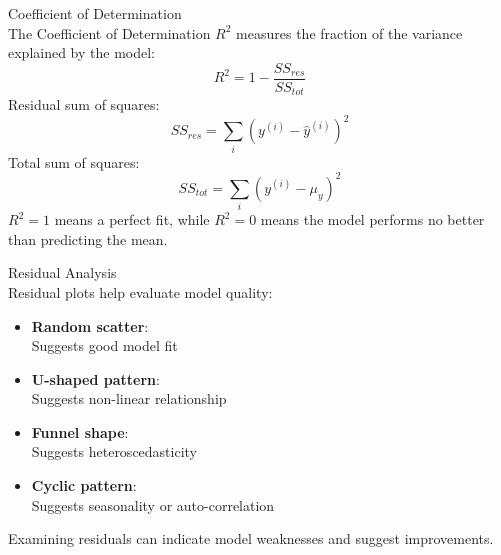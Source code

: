 \begin{theorem}{Coefficient of Determination}\\
The Coefficient of Determination $R^2$ measures the fraction of the variance explained by the model:
\[R^2 = 1 - \frac{SS_{res}}{SS_{tot}}\]
Residual sum of squares:
$$SS_{res} = \sum_i (y^{(i)} - \hat{y}^{(i)})^2$$
Total sum of squares:
$$SS_{tot} = \sum_i (y^{(i)} - \mu_y)^2$$
$R^2 = 1$ means a perfect fit, while $R^2 = 0$ means the model performs no better than predicting the mean.
\end{theorem}

\begin{corollary}{Residual Analysis}\\
Residual plots help evaluate model quality:
\begin{itemize}
    \item \textbf{Random scatter}: \\Suggests good model fit
    \item \textbf{U-shaped pattern}: \\ Suggests non-linear relationship
    \item \textbf{Funnel shape}: \\ Suggests heteroscedasticity
    \item \textbf{Cyclic pattern}: \\ Suggests seasonality or auto-correlation
\end{itemize}
\vspace{1mm}
Examining residuals can indicate model weaknesses and suggest improvements.
\end{corollary}

\multend

